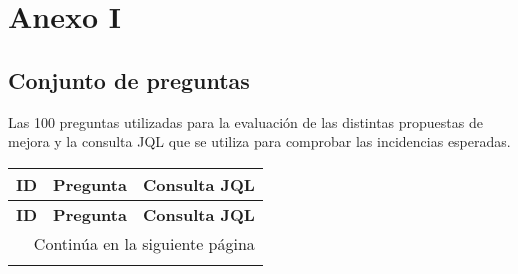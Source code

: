 \section{Anexo I}

\subsection{Conjunto de preguntas}
Las 100 preguntas utilizadas para la evaluación de las distintas propuestas de mejora y la consulta JQL que se utiliza para comprobar las incidencias esperadas.

\begin{center}
    \begin{longtable}{ | p{1cm} | p{8cm} | p{6cm} | }
        \hline
        \textbf{ID} & \textbf{Pregunta} & \textbf{Consulta JQL} \\
        \hline
        \endfirsthead

        \hline
        \textbf{ID} & \textbf{Pregunta} & \textbf{Consulta JQL} \\
        \hline
        \endhead

        \hline
        \multicolumn{3}{|r|}{Continúa en la siguiente página} \\
        \hline
        \endfoot

        \hline
        \endlastfoot


\end{longtable}
\end{center}
